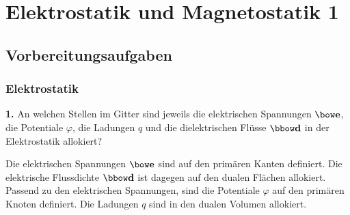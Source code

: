\documentclass[Protokollheft.tex]{subfiles}
\begin{document}
\chapter{Elektrostatik und Magnetostatik 1}
\section{Vorbereitungsaufgaben}

{\subsection{Elektrostatik}}

\begin{framed}
	\noindent \textbf{1.} An welchen Stellen im Gitter sind jeweils die elektrischen
Spannungen $\efit$, die Potentiale $\varphi$, die Ladungen $q$ und die
dielektrischen Flüsse $\dfit$ in der Elektrostatik allokiert?\label{exer:allocateElectrical}
\end{framed}
\noindent
Die elektrischen Spannungen $\efit$ sind auf den primären Kanten definiert. Die elektrische Flussdichte $\dfit$ ist dagegen auf den dualen Flächen allokiert. Passend zu den elektrischen Spannungen, sind die Potentiale $\varphi$ auf den primären Knoten definiert. Die Ladungen $q$ sind in den dualen Volumen allokiert.
\end{document}

